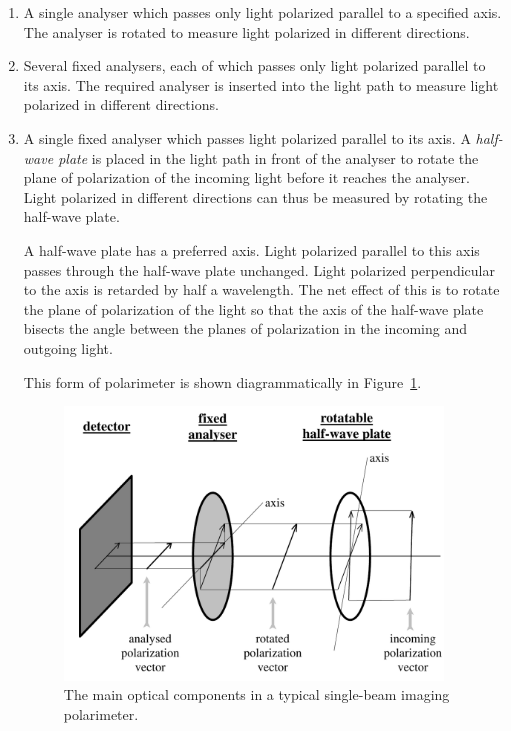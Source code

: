 \documentclass[twoside,11pt]{starlink}
\begin{document}
\begin{enumerate}

\item A single analyser which passes only light polarized parallel to a
specified axis. The analyser is rotated to measure light polarized in
different directions.

\item Several fixed analysers, each of which passes only light polarized
parallel to its axis. The required analyser is inserted into the light path
to measure light polarized in different directions.

\item A single fixed analyser which passes light polarized parallel to its axis.
A \emph{half-wave plate} is placed in the light path in front of the
analyser to rotate the plane of polarization of the incoming light
before it reaches the analyser. Light polarized in different directions
can thus be measured by rotating the half-wave plate.

A half-wave plate has a preferred axis. Light polarized parallel to this
axis passes through the half-wave plate unchanged. Light polarized
perpendicular to the axis is retarded by half a wavelength. The net
effect of this is to  rotate the plane of polarization of the light so
that the axis of the half-wave plate bisects the angle between the planes
of polarization in the incoming and outgoing light.

This form of polarimeter is shown diagrammatically in
Figure~\ref{fig:singopt}.

  \vspace{2mm}
  \begin{figure}[htb]
  \begin{center}
  \includegraphics[clip,width=0.95\textwidth]{sun223_figures/singopt}
  \caption{The main optical components in a typical single-beam imaging polarimeter.}
  \label{fig:singopt}
  \end{center}
  \end{figure}

\end{enumerate}
\end{document}
